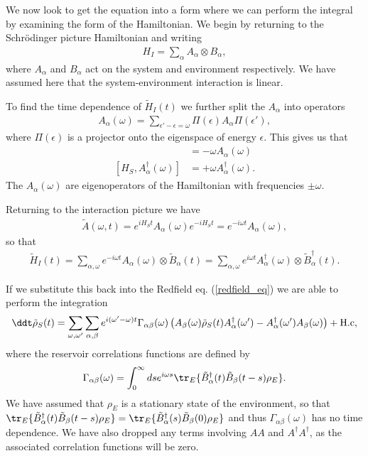 We now look to get the equation into a form where we can perform the integral by examining the form of the Hamiltonian. We begin by returning to the Schr\"odinger picture Hamiltonian and writing
\begin{align}
  H_I = \sum_\alpha A_\alpha \otimes B_\alpha,
\end{align}
where $A_\alpha$ and $B_\alpha$ act on the system and environment respectively. We have assumed here that the system-environment interaction is linear.

To find the time dependence of $\tilde{H}_I(t)$ we further split the $A_\alpha$ into operators 
\begin{align}
  A_\alpha(\omega) = \sum_{\epsilon' - \epsilon = \omega} \Pi(\epsilon)A_\alpha \Pi(\epsilon'),
\end{align}
where $\Pi(\epsilon)$ is a projector onto the eigenspace of energy $\epsilon$. This gives us that
\begin{align}
  [H_S, A_\alpha(\omega)] &= - \omega A_\alpha(\omega) \\
  [H_S, A^\dagger_\alpha(\omega)] &= + \omega A^\dagger_\alpha(\omega).
\end{align}
The $A_\alpha(\omega)$ are eigenoperators of the Hamiltonian with frequencies $\pm \omega$.

Returning to the interaction picture we have
\begin{align}
  \tilde{A}(\omega, t) = e^{iH_S t}A_\alpha(\omega) e^{-iH_S t} = e^{-i\omega t} A_\alpha(\omega),
\end{align}
so that
\begin{align}
  \tilde{H}_I(t) = \sum_{\alpha, \omega} e^{-i \omega t} A_\alpha(\omega)\otimes \tilde{B}_\alpha(t) = \sum_{\alpha, \omega} e^{i \omega t} A^\dagger_\alpha(\omega)\otimes \tilde{B}^\dagger_\alpha(t).
\end{align}

If we substitute this back into the Redfield eq. (\ref{redfield_eq}) we are able to perform the integration
\begin{align}
  \label{me_before_rwa}
  \ddt \tilde{\rho}_S(t) = \sum_{\omega, \omega'} \sum_{\alpha, \beta} e^{i(\omega'-\omega)t} \Gamma_{\alpha\beta}(\omega)\left(A_\beta(\omega)\tilde{\rho}_S(t)A^\dagger_\alpha(\omega') - A^\dagger_\alpha(\omega')A_\beta(\omega)\right) + \text{H.c},
\end{align}
where the reservoir correlations functions are defined by
\begin{align}
  \Gamma_{\alpha\beta}(\omega) = \int_0^\infty ds e^{i\omega s} \tr_E \{ \tilde{B}_\alpha^\dagger(t) \tilde{B}_\beta(t-s) \rho_E \}.
\end{align}
We have assumed that $\rho_E$ is a stationary state of the environment, so that $\tr_E \{\tilde{B}_\alpha^\dagger(t) \tilde{B}_\beta(t-s) \rho_E \} = \tr_E \{\tilde{B}_\alpha^\dagger(s) \tilde{B}_\beta(0) \rho_E \}$ and thus $\Gamma_{\alpha\beta}(\omega)$ has no time dependence. We have also dropped any terms involving $AA$ and $A^\dagger A^\dagger$, as the associated correlation functions will be zero.

